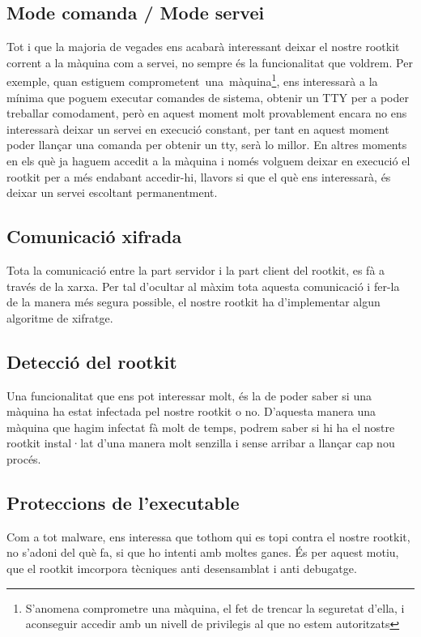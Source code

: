 \subsection{Mode comanda / Mode servei}
Tot i que la majoria de vegades ens acabarà interessant deixar el nostre rootkit corrent a la màquina com a servei, no sempre
és la funcionalitat que voldrem. Per exemple, quan estiguem \mbox{comprometent una màquina}\footnote{S'anomena comprometre una màquina,
el fet de trencar la seguretat d'ella, i aconseguir accedir amb un nivell de privilegis al que no estem autoritzats}, ens interessarà
a la mínima que poguem executar comandes de sistema, obtenir un TTY per a poder treballar comodament, però en aquest moment
molt provablement encara no ens interessarà deixar un servei en execució constant, per tant en aquest moment poder llançar una 
comanda per obtenir un tty, serà lo millor. En altres moments en els què ja haguem accedit a la màquina i només volguem deixar en
execució el rootkit per a més endabant accedir-hi, llavors si que el què ens interessarà, és deixar un servei escoltant permanentment.

\subsection{Comunicació xifrada}
Tota la comunicació entre la part servidor i la part client del rootkit, es fà a través de la xarxa. Per tal d'ocultar al màxim 
tota aquesta comunicació i fer-la de la manera més segura possible, el nostre rootkit ha d'implementar algun algoritme de xifratge.

\subsection{Detecció del rootkit}
Una funcionalitat que ens pot interessar molt, és la de poder saber si una màquina ha estat infectada pel nostre rootkit o no. 
D'aquesta manera una màquina que hagim infectat fà molt de temps, podrem saber si hi ha el nostre rootkit instal·lat d'una manera molt 
senzilla i sense arribar a llançar cap nou procés.

\subsection{Proteccions de l'executable}
Com a tot malware, ens interessa que tothom qui es topi contra el nostre rootkit, no s'adoni del què fa, si que ho intenti amb moltes
ganes. És per aquest motiu, que el rootkit imcorpora tècniques anti desensamblat i anti debugatge.

